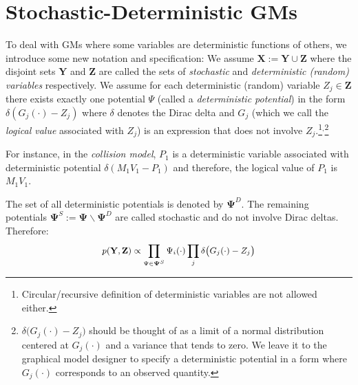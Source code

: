 \documentclass[]{article}
\newcommand{\bvec}[1]{\textbf{#1}}
\newcommand{\pr}{p}
\begin{document}
\section{Stochastic-Deterministic GMs}
\label{sect:contribution1}
To deal with GMs where some variables are deterministic functions of others,
we introduce some new notation and specification:
We assume $\bvec{X} := \bvec{Y} \cup \bvec{Z}$
where the disjoint sets $\bvec{Y}$ and $\bvec{Z}$ are called the sets of \emph{stochastic} and \emph{deterministic  (random) variables} respectively. 
We assume for each deterministic (random) variable $Z_j \in  \bvec{Z}$ there exists 
exactly one potential $\Psi$ (called a \emph{deterministic potential}) in the form
$\delta(G_j (\cdot) - Z_j)$ where  $\delta$ denotes the Dirac delta and $G_j$ (which we call the \emph{logical value} associated with $Z_j$) is 
an expression that does not involve $Z_j$.\footnote{Circular/recursive definition of deterministic variables are not allowed either.}$^{,}$\footnote{
$\delta\big( G_j(\cdot) - Z_j \big)$ should be thought of as a limit of a normal distribution centered at $G_j(\cdot)$ and a variance that tends to zero.
We leave it to the graphical model designer to specify a deterministic potential in a form where $G_j(\cdot)$ corresponds to an observed quantity.} 

For instance, in the \emph{collision model}, $P_1$ is a deterministic variable associated
with deterministic potential $\delta(M_1V_1 - P_1)$ 
and therefore, the logical value of $P_1$ is $M_1 V_1$.

The set of all deterministic potentials is denoted by $\boldsymbol{\Psi}^D$.
The remaining potentials $\boldsymbol{\Psi}^S := \boldsymbol{\Psi} \backslash \boldsymbol{\Psi}^D$ are called stochastic and do not involve Dirac deltas. 
Therefore:
\begin{equation}\footnotesize
\label{e:infer.sd}
\pr(\bvec{Y}, \bvec{Z}) \propto 
\prod_{\Psi \in \boldsymbol{\Psi}^S} \Psi_i (\cdot)
\prod_j \delta \big(G_j(\cdot) - Z_j
\big)
\end{equation}
\end{document}
